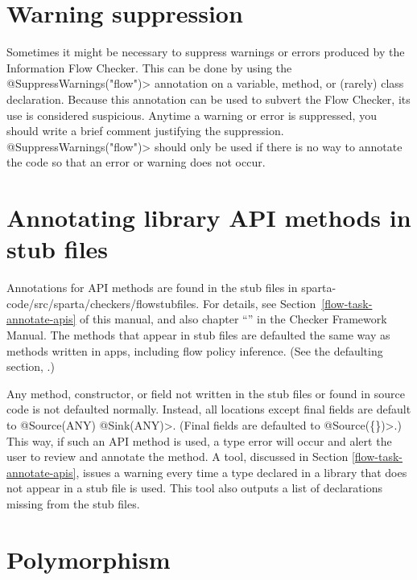 \section{Warning suppression\label{sec:waringsuppression}}
 
Sometimes it might be necessary to suppress warnings or errors produced by
the Information Flow Checker.  This can be done by using the
\<@SuppressWarnings("flow")> annotation on a variable, method, or (rarely)
class declaration.  Because this annotation can be used to subvert the Flow
Checker, its use is considered suspicious.  Anytime a warning or error is
suppressed, you should write a brief comment justifying the suppression.
\<@SuppressWarnings("flow")> should only be used if there is no way to
annotate the code so that an error or warning does not occur.  

\section{Annotating library API methods in stub files\label{sec:apispecs}}

Annotations for API methods are found in the stub files in sparta-code/src/sparta/checkers/flowstubfiles.
For details, see Section~\ref{flow-task-annotate-apis} of this manual, and also 
chapter
``'' in the Checker Framework Manual.  
 The methods that appear in stub files are defaulted the same way as methods 
written in apps, including flow policy inference.  
(See the defaulting section, .) 

Any method, constructor, or field  not written in the stub files or found in source code is not defaulted normally. 
 Instead,  all locations except final fields are default to \<@Source(ANY) @Sink(ANY)>.  
 (Final fields are defaulted to \<@Source(\{\})>.)
 This way, if such an API method is used, a type error
  will occur and alert the user to review and annotate the method. 
  A tool, discussed in Section \ref{flow-task-annotate-apis}, issues a warning every time a type declared in a 
  library that does not appear in a stub file is used.  This tool also outputs a list of declarations missing from
  the stub files. 


\section{Polymorphism \label{sec:polyflowsources}}


